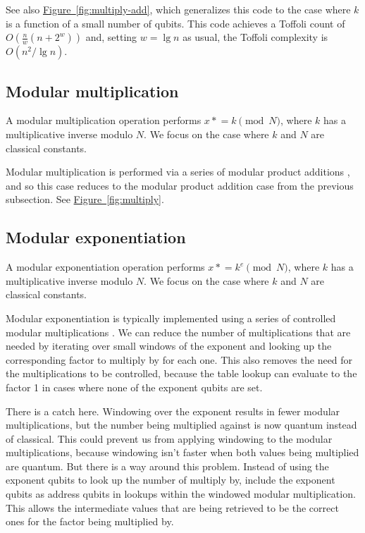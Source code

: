 \documentclass[onecolumn,unpublished]{quantumarticle}
\theoremstyle{definition}
\theoremstyle{definition}
\theoremstyle{definition}
\newcommand{\fig}[1]{\hyperref[fig:#1]{Figure~\ref*{fig:#1}}}
\newcommand{\timeseq}{\mathrel{\ast}=}
\begin{document}
See also \fig{multiply-add}, which generalizes this code to the case where $k$ is a function of a small number of qubits.
This code achieves a Toffoli count of $O(\frac{n}{w} (n + 2^w))$ and, setting $w=\lg n$ as usual, the Toffoli complexity is $O(n^2/\lg n)$.


\subsection{Modular multiplication}

A modular multiplication operation performs $x \timeseq k \pmod{N}$, where $k$ has a multiplicative inverse modulo $N$.
We focus on the case where $k$ and $N$ are classical constants.

Modular multiplication is performed via a series of modular product additions \cite{zalka2006pure, haner2016factoring, gidney2017factoring}, and so this case reduces to the modular product addition case from the previous subsection.
See \fig{multiply}.




\subsection{Modular exponentiation}

A modular exponentiation operation performs $x \timeseq k^e \pmod{N}$, where $k$ has a multiplicative inverse modulo $N$.
We focus on the case where $k$ and $N$ are classical constants.

Modular exponentiation is typically implemented using a series of controlled modular multiplications \cite{vedral1996arithmetic,zalka1998fast,haner2016factoring,gidney2017factoring}.
We can reduce the number of multiplications that are needed by iterating over small windows of the exponent and looking up the corresponding factor to multiply by for each one.
This also removes the need for the multiplications to be controlled, because the table lookup can evaluate to the factor 1 in cases where none of the exponent qubits are set.

There is a catch here.
Windowing over the exponent results in fewer modular multiplications, but the number being multiplied against is now quantum instead of classical.
This could prevent us from applying windowing to the modular multiplications, because windowing isn't faster when both values being multiplied are quantum.
But there is a way around this problem.
Instead of using the exponent qubits to look up the number of multiply by, include the exponent qubits as address qubits in lookups within the windowed modular multiplication.
This allows the intermediate values that are being retrieved to be the correct ones for the factor being multiplied by.
\end{document}
